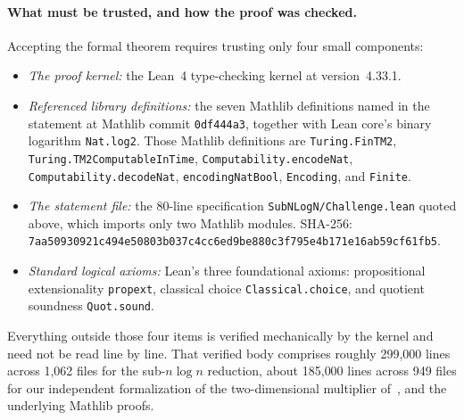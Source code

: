 \paragraph{What must be trusted, and how the proof was checked.}
Accepting the formal theorem requires trusting only four small components:
\begin{itemize}[leftmargin=*,itemsep=2pt]
\item \emph{The proof kernel:} the Lean~4 type-checking kernel at version~4.33.1.

\item \emph{Referenced library definitions:} the seven Mathlib definitions named in the statement at Mathlib commit \texttt{0df444a3}, together with Lean core's binary logarithm \texttt{Nat.log2}. Those Mathlib definitions are \texttt{Turing.\allowbreak FinTM2}, \texttt{Turing.\allowbreak TM2ComputableInTime}, \texttt{Computability.\allowbreak encodeNat}, \texttt{Computability.\allowbreak decodeNat}, \texttt{encodingNatBool}, \texttt{Encoding}, and \texttt{Finite}.

\item \emph{The statement file:} the 80-line specification \texttt{SubNLogN/\allowbreak Challenge.lean} quoted above, which imports only two Mathlib modules. SHA-256: \texttt{7aa50930\allowbreak 921c494e\allowbreak 50803b03\allowbreak 7c4cc6ed\allowbreak 9be880c3\allowbreak f795e4b1\allowbreak 71e16ab5\allowbreak 9cf61fb5}.

\item \emph{Standard logical axioms:} Lean's three foundational axioms: propositional extensionality \texttt{propext}, classical choice \texttt{Classical.choice}, and quotient soundness \texttt{Quot.sound}.
\end{itemize}

Everything outside those four items is verified mechanically by the kernel and need not be read line by line. That verified body comprises roughly 299{,}000 lines across 1{,}062 files for the sub-$n\log n$ reduction, about 185{,}000 lines across 949 files for our independent formalization of the two-dimensional multiplier of~\cite{MS}, and the underlying Mathlib proofs.

